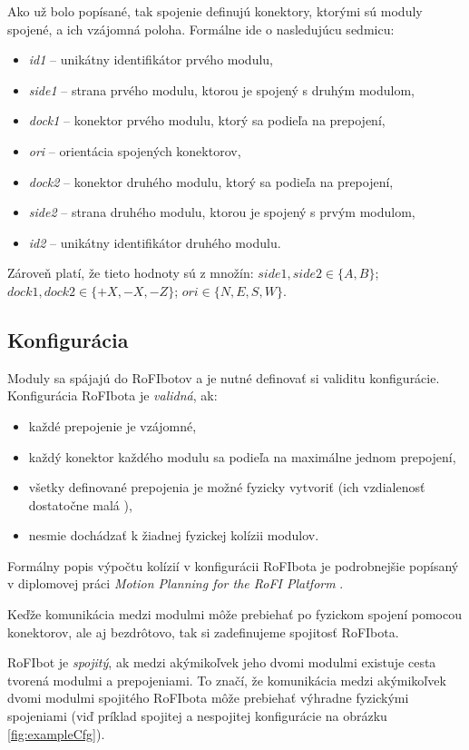 \documentclass[
  digital, %
  oneside, %
  notable,   %
  lof,     %
  nolot,     %
]{fithesis3}
\begin{document}
Ako už bolo popísané, tak spojenie definujú konektory, ktorými sú moduly spojené, a ich vzájomná poloha. Formálne ide o nasledujúcu sedmicu: 
\begin{itemize}
    \item \textit{id1} -- unikátny identifikátor prvého modulu, 
    \item \textit{side1} -- strana prvého modulu, ktorou je spojený s druhým modulom, 
    \item \textit{dock1} -- konektor prvého modulu, ktorý sa podieľa na prepojení,
    \item \textit{ori} -- orientácia spojených konektorov,
    \item \textit{dock2} -- konektor druhého modulu, ktorý sa podieľa na prepojení,
    \item \textit{side2} -- strana druhého modulu, ktorou je spojený s prvým modulom, 
    \item \textit{id2} -- unikátny identifikátor druhého modulu. 
\end{itemize}
Zároveň platí, že tieto hodnoty sú z množín: $side1, side2 \in \{A, B\}$; $dock1, dock2 \in \{+X, -X, -Z\}$; $ori \in \{N, E, S, W\}$.

\subsection{Konfigurácia}
\label{sec:formalSpecCfg}
Moduly sa spájajú do RoFIbotov a je nutné definovať si validitu konfigurácie. Konfigurácia RoFIbota je \textit{validná}, ak: 
\begin{itemize}
    \item každé prepojenie je vzájomné,
    \item každý konektor každého modulu sa podieľa na maximálne jednom prepojení, 
    \item všetky definované prepojenia je možné fyzicky vytvoriť (ich vzdialenosť dostatočne malá \cite{rofiCom}), 
    \item nesmie dochádzať k žiadnej fyzickej kolízii modulov. 
\end{itemize}
Formálny popis výpočtu kolízií v konfigurácii RoFIbota je podrobnejšie popísaný v diplomovej práci \textit{Motion Planning for the RoFI Platform} \cite{vozarovaMasterThesis}. 

Keďže komunikácia medzi modulmi môže prebiehať po fyzickom spojení pomocou konektorov, ale aj bezdrôtovo, tak si zadefinujeme spojitosť RoFIbota. 

RoFIbot je \textit{spojitý}, ak medzi akýmikoľvek jeho dvomi modulmi existuje cesta tvorená modulmi a prepojeniami. To značí, že komunikácia medzi akýmikoľvek dvomi modulmi spojitého RoFIbota môže prebiehať výhradne fyzickými spojeniami (viď príklad spojitej a nespojitej konfigurácie na obrázku \ref{fig:exampleCfg}). 
\end{document}
